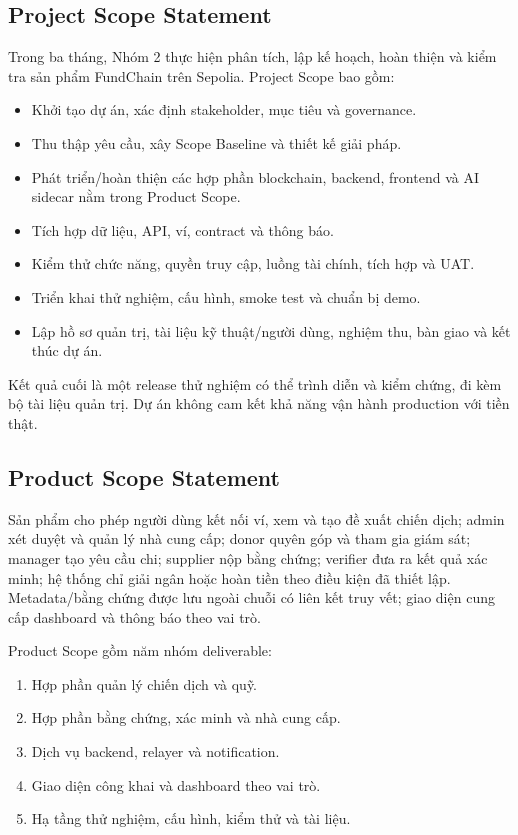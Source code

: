 \subsection{Project Scope Statement}

Trong ba tháng, Nhóm 2 thực hiện phân tích, lập kế hoạch, hoàn thiện và kiểm tra sản phẩm FundChain trên Sepolia. Project Scope bao gồm:

\begin{itemize}
  \item Khởi tạo dự án, xác định stakeholder, mục tiêu và governance.
  \item Thu thập yêu cầu, xây Scope Baseline và thiết kế giải pháp.
  \item Phát triển/hoàn thiện các hợp phần blockchain, backend, frontend và AI sidecar nằm trong Product Scope.
  \item Tích hợp dữ liệu, API, ví, contract và thông báo.
  \item Kiểm thử chức năng, quyền truy cập, luồng tài chính, tích hợp và UAT.
  \item Triển khai thử nghiệm, cấu hình, smoke test và chuẩn bị demo.
  \item Lập hồ sơ quản trị, tài liệu kỹ thuật/người dùng, nghiệm thu, bàn giao và kết thúc dự án.
\end{itemize}

Kết quả cuối là một release thử nghiệm có thể trình diễn và kiểm chứng, đi kèm bộ tài liệu quản trị. Dự án không cam kết khả năng vận hành production với tiền thật.

\subsection{Product Scope Statement}

Sản phẩm cho phép người dùng kết nối ví, xem và tạo đề xuất chiến dịch; admin xét duyệt và quản lý nhà cung cấp; donor quyên góp và tham gia giám sát; manager tạo yêu cầu chi; supplier nộp bằng chứng; verifier đưa ra kết quả xác minh; hệ thống chỉ giải ngân hoặc hoàn tiền theo điều kiện đã thiết lập. Metadata/bằng chứng được lưu ngoài chuỗi có liên kết truy vết; giao diện cung cấp dashboard và thông báo theo vai trò.

Product Scope gồm năm nhóm deliverable:

\begin{enumerate}
  \item Hợp phần quản lý chiến dịch và quỹ.
  \item Hợp phần bằng chứng, xác minh và nhà cung cấp.
  \item Dịch vụ backend, relayer và notification.
  \item Giao diện công khai và dashboard theo vai trò.
  \item Hạ tầng thử nghiệm, cấu hình, kiểm thử và tài liệu.
\end{enumerate}

